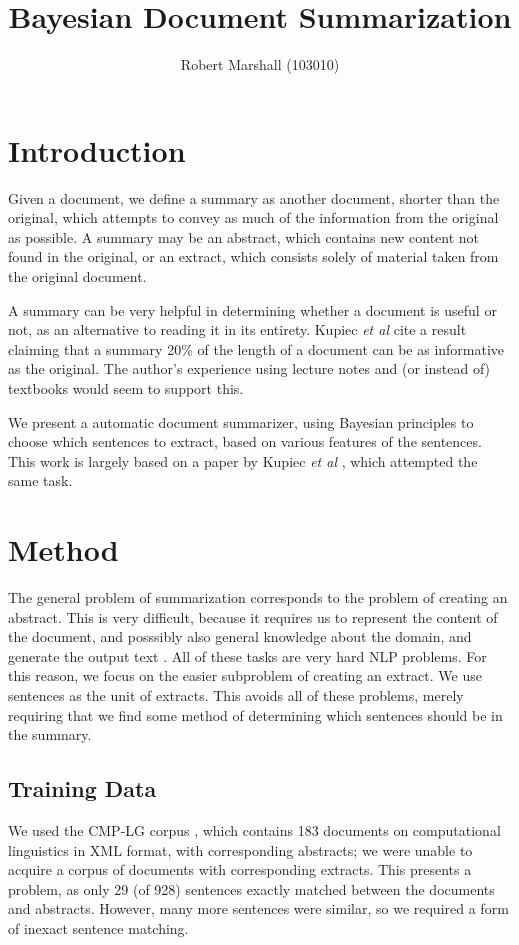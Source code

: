 \documentclass[a4paper, 10pt]{article}
\author{Robert Marshall (103010)}
\title{Bayesian Document Summarization}
\begin{document}
\maketitle

\section{Introduction}
Given a document, we define a summary as another document, shorter than the original, which attempts to convey as much of the information from the original as possible. A summary may be an abstract, which contains new content not found in the original, or an extract, which consists solely of material taken from the original document.

A summary can be very helpful in determining whether a document is useful or not, as an alternative to reading it in its entirety. Kupiec {\it et al} cite a result claiming that a summary 20\% of the length of a document can be as informative as the original. The author's experience using lecture notes and (or instead of) textbooks would seem to support this.

We present a automatic document summarizer, using Bayesian principles to choose which sentences to extract, based on various features of the sentences. This work is largely based on a paper by Kupiec {\it et al} \cite{kupiec95trainable}, which attempted the same task.

\section{Method}
The general problem of summarization corresponds to the problem of creating an abstract. This is very difficult, because it requires us to represent the content of the document, and posssibly also general knowledge about the domain, and generate the output text \cite{hovy02, Mani}. All of these tasks are very hard NLP problems. For this reason, we focus on the easier subproblem of creating an extract. We use sentences as the unit of extracts. This avoids all of these problems, merely requiring that we find some method of determining which sentences should be in the summary.

\subsection{Training Data}
We used the CMP-LG corpus \cite{CMP-LG}, which contains 183 documents on computational linguistics in XML format, with corresponding abstracts; we were unable to acquire a corpus of documents with corresponding extracts. This presents a problem, as only 29 (of 928) sentences exactly matched between the documents and abstracts. However, many more sentences were similar, so we required a form of inexact sentence matching.
\end{document}
